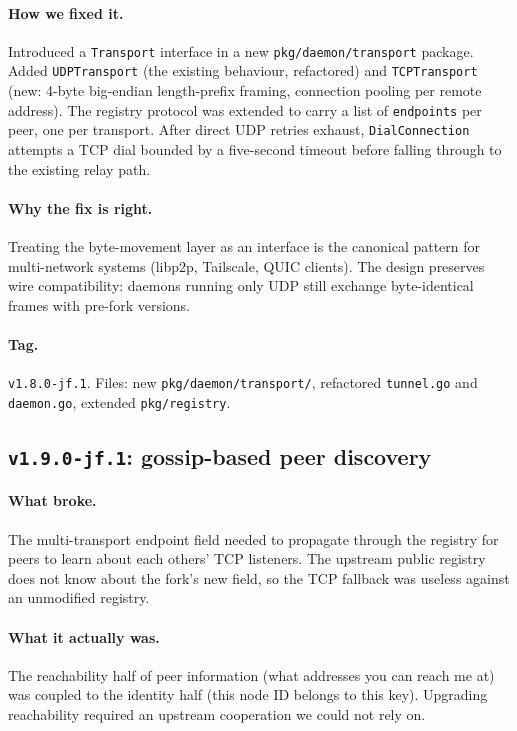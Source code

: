 \documentclass[11pt,a4paper]{article}
\begin{document}
\paragraph{How we fixed it.} Introduced a \texttt{Transport}
interface in a new \texttt{pkg/daemon/transport} package. Added
\texttt{UDPTransport} (the existing behaviour, refactored) and
\texttt{TCPTransport} (new: 4-byte big-endian length-prefix
framing, connection pooling per remote address). The registry
protocol was extended to carry a list of \texttt{endpoints} per
peer, one per transport. After direct UDP retries exhaust,
\texttt{DialConnection} attempts a TCP dial bounded by a
five-second timeout before falling through to the existing
relay path.

\paragraph{Why the fix is right.} Treating the byte-movement
layer as an interface is the canonical pattern for multi-network
systems (libp2p, Tailscale, QUIC clients). The design preserves
wire compatibility: daemons running only UDP still exchange
byte-identical frames with pre-fork versions.

\paragraph*{Tag.} \texttt{v1.8.0-jf.1}. Files: new
\texttt{pkg/daemon/transport/}, refactored \texttt{tunnel.go} and
\texttt{daemon.go}, extended \texttt{pkg/registry}.

\subsection{\texttt{v1.9.0-jf.1}: gossip-based peer discovery}

\paragraph{What broke.} The multi-transport endpoint field
needed to propagate through the registry for peers to learn
about each others' TCP listeners. The upstream public registry
does not know about the fork's new field, so the TCP fallback
was useless against an unmodified registry.

\paragraph{What it actually was.} The reachability half of peer
information (what addresses you can reach me at) was coupled to
the identity half (this node ID belongs to this key). Upgrading
reachability required an upstream cooperation we could not rely
on.
\end{document}
